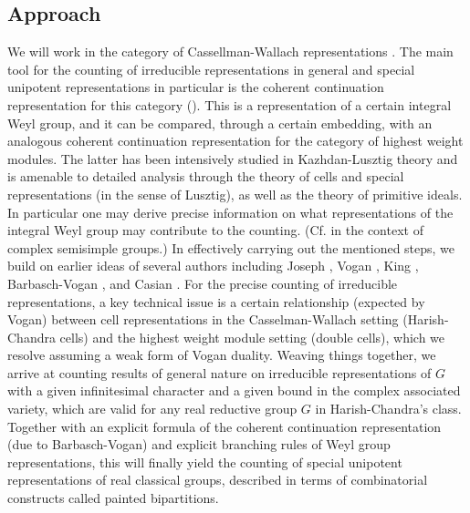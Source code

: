 \documentclass[12pt]{amsart}
\numberwithin{equation}{section}
\theoremstyle{remark}
\begin{document}
\subsection{Approach}
We will work in the category of Cassellman-Wallach representations \cite[Chapter 11]{Wa2}. The main tool for the counting of irreducible representations in general and special unipotent representations in particular is the coherent continuation representation for this category (\cite[Chapter 7]{Vg}). This is a representation of a certain integral Weyl group, and it can be compared, through a certain embedding, with an analogous coherent continuation representation for the category of highest weight modules. The latter has been intensively studied in Kazhdan-Lusztig theory and is amenable to detailed analysis through the theory of cells and special representations (in the sense of Lusztig), as well as the theory of primitive ideals. In particular one may derive precise information on what representations of the integral Weyl group may contribute to the counting.
(Cf. \cite[Section 5]{BVUni} in the context of complex semisimple groups.) In effectively carrying out the mentioned steps, we build on earlier ideas of several authors including Joseph \cite{J1,J2}, Vogan \cite{Vg}, King \cite{King}, Barbasch-Vogan \cite{BVUni}, and Casian \cite{Cas}.
For the precise counting of irreducible representations, a key technical issue is a certain relationship (expected by Vogan) between cell representations in the
Casselman-Wallach setting (Harish-Chandra cells) and the highest weight module setting (double cells), which we resolve assuming a weak form of Vogan duality.
Weaving things together, we arrive at counting results of general nature on irreducible representations of $G$ with a given infinitesimal character and a given bound in the complex associated variety, which are valid for any real reductive group $G$ in Harish-Chandra's class. Together with an explicit formula of the coherent continuation representation (due to Barbasch-Vogan) and explicit branching rules of Weyl group representations, this will finally yield the counting of special unipotent representations of real classical groups, described in terms of combinatorial constructs called painted bipartitions.
\end{document}

